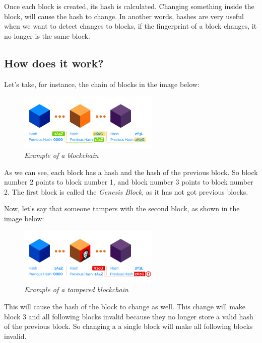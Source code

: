 \documentclass{article}
\newcommand\tab[1][1cm]{\hspace*{#1}}
\begin{document}
Once each block is created, its hash is calculated. Changing something inside the block, will cause the hash to change. In another words, hashes are very useful when we want to detect changes to blocks, if the fingerprint of a block changes, it no longer is the same block.

\subsection{How does it work?}

\tab Let's take, for instance, the chain of blocks in the image below:

\begin{figure}[H]
    \begin{center}
        \includegraphics[width=0.6\textwidth]{images/changes_in_block.png}
        \caption{\textit{Example of a blockchain}}
    \end{center}
\end{figure}

As we can see, each block has a hash and the hash of the previous block. So block number 2 points to block number 1, and block number 3 points to block number 2. The first block is called the \textit{Genesis Block}, as it has not got previous blocks.

Now, let's say that someone tampers with the second block, as shown in the image below:

\begin{figure}[H]
    \begin{center}
        \includegraphics[width=0.6\textwidth]{images/invalid_hash.png}
        \caption{\textit{Example of a tampered blockchain}}
    \end{center}
\end{figure}

This will cause the hash of the block to change as well. This change will make block 3 and all following blocks invalid because they no longer store a valid hash of the previous block. So changing a a single block will make all following blocks invalid.
\end{document}
